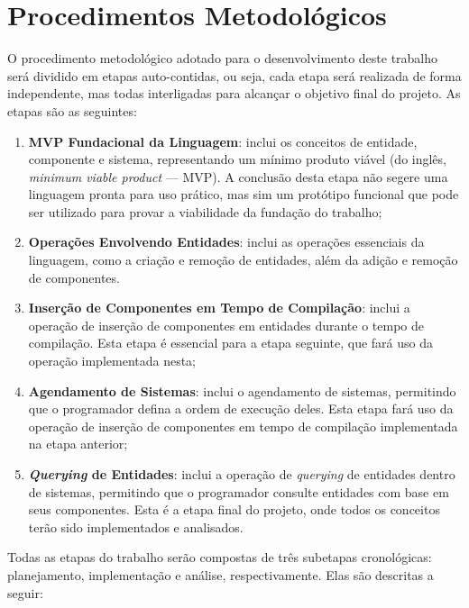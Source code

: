 \section{Procedimentos Metodológicos}

O procedimento metodológico adotado para o desenvolvimento deste trabalho será dividido em etapas auto-contidas, ou seja, cada etapa será realizada de forma independente, mas todas interligadas para alcançar o objetivo final do projeto. As etapas são as seguintes:

\begin{enumerate}
    \item \textbf{MVP Fundacional da Linguagem}: inclui os conceitos de entidade, componente e sistema, representando um mínimo produto viável (do inglês, \textit{minimum viable product} — MVP). A conclusão desta etapa não segere uma linguagem pronta para uso prático, mas sim um protótipo funcional que pode ser utilizado para provar a viabilidade da fundação do trabalho;
    \item \textbf{Operações Envolvendo Entidades}: inclui as operações essenciais da linguagem, como a criação e remoção de entidades, além da adição e remoção de componentes.
    \item \textbf{Inserção de Componentes em Tempo de Compilação}: inclui a operação de inserção de componentes em entidades durante o tempo de compilação. Esta etapa é essencial para a etapa seguinte, que fará uso da operação implementada nesta;
    \item \textbf{Agendamento de Sistemas}: inclui o agendamento de sistemas, permitindo que o programador defina a ordem de execução deles. Esta etapa fará uso da operação de inserção de componentes em tempo de compilação implementada na etapa anterior;
    \item \textbf{\textit{Querying} de Entidades}: inclui a operação de \textit{querying} de entidades dentro de sistemas, permitindo que o programador consulte entidades com base em seus componentes. Esta é a etapa final do projeto, onde todos os conceitos terão sido implementados e analisados.
\end{enumerate}

Todas as etapas do trabalho serão compostas de três subetapas cronológicas: planejamento, implementação e análise, respectivamente. Elas são descritas a seguir:

